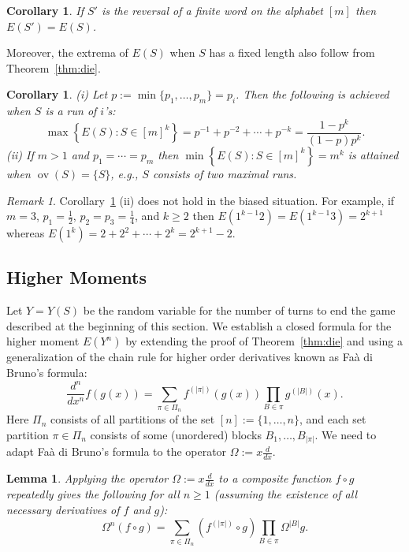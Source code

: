 \documentclass[10pt]{amsart}
\newtheorem{lemma}[theorem]{Lemma}
\newtheorem{corollary}[theorem]{Corollary}
\theoremstyle{definition}
\theoremstyle{remark}
\newtheorem{remark}[theorem]{Remark}
\DeclareMathOperator{\overlap}{ov}
\begin{document}
\begin{corollary}
If $S'$ is the reversal of a finite word on the alphabet $[m]$ then $E(S')=E(S)$.
\end{corollary}

Moreover, the extrema of $E(S)$ when $S$ has a fixed length also follow from Theorem~\ref{thm:die}.

\begin{corollary}\label{cor:extrema}
(i) Let $p:= \min\{p_1,\ldots,p_m\} = p_i$. %
Then the following is achieved when $S$ is a run of $i$'s:
\[
\max \left\{E(S): S\in[m]^k \right\} = %
p^{-1} + p^{-2} + \cdots + p^{-k} = \frac{1-p^k}{(1-p)p^k}.
\]
(ii) If $m>1$ and $p_1=\cdots=p_m$ then $\min \left\{E(S): S\in[m]^k \right\}= m^k$ is attained when $\overlap(S)=\{S\}$, e.g., $S$ consists of two maximal runs.
\end{corollary}

\begin{remark}
Corollary~\ref{cor:extrema} (ii) does not hold in the biased situation.
For example, if $m=3$, $p_1=\frac12$, $p_2=p_3=\frac14$, and $k\ge2$ then $E(1^{k-1}2) = E(1^{k-1}3) = 2^{k+1}$ whereas $E(1^k) = 2 + 2^2 +\cdots + 2^k = 2^{k+1}-2$.
\end{remark}

\subsection{Higher Moments}
Let $Y=Y(S)$ be the random variable for the number of turns to end the game described at the beginning of this section.
We establish a closed formula for the higher moment $E(Y^n)$ by extending the proof of Theorem~\ref{thm:die} and using a generalization of the chain rule for higher order derivatives known as Fa\`a di Bruno's formula:
\[
\frac{d^n}{dx^n} f(g(x)) = \sum_{\pi\in\Pi_n} f^{(|\pi|)}(g(x))
\prod_{B\in \pi} g^{(|B|)}(x).
\] 
Here $\Pi_n$ consists of all partitions of the set $[n]:=\{1,\ldots,n\}$, and each set partition $\pi\in\Pi_n$ consists of some (unordered) blocks $B_1,\ldots, B_{|\pi|}$.
We need to adapt Fa\`a di Bruno's formula to the operator $\Omega:=x\frac{d}{dx}$.

\begin{lemma}\label{lem:Omega}
Applying the operator $\Omega:=x\frac{d}{dx}$ to a composite function $f\circ g$  repeatedly gives the following for all $n\ge1$ (assuming the existence of all necessary derivatives of $f$ and $g$):
\[
\Omega^n (f\circ g) = \sum_{\pi\in\Pi_n} \left( f^{(|\pi|)}\circ g \right) \prod_{B\in \pi} \Omega^{|B|}g.
\] 
\end{lemma}
\end{document}
